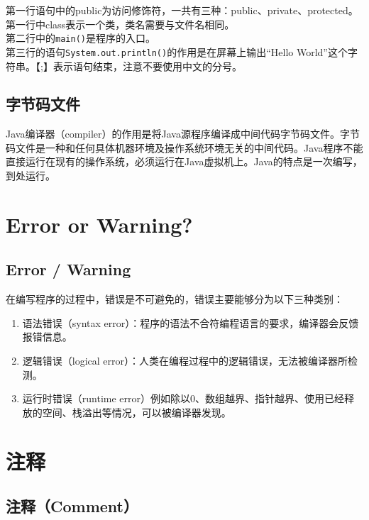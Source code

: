 第一行语句中的public为访问修饰符，一共有三种：public、private、protected。第一行中class表示一个类，类名需要与文件名相同。 \\

第二行中的\lstinline|main()|是程序的入口。 \\

第三行的语句\lstinline|System.out.println()|的作用是在屏幕上输出“Hello World”这个字符串。【;】表示语句结束，注意不要使用中文的分号。

\subsection{字节码文件}

Java编译器（compiler）的作用是将Java源程序编译成中间代码字节码文件。字节码文件是一种和任何具体机器环境及操作系统环境无关的中间代码。Java程序不能直接运行在现有的操作系统，必须运行在Java虚拟机上。Java的特点是一次编写，到处运行。

\newpage

\section{Error or Warning?}

\subsection{Error / Warning}

在编写程序的过程中，错误是不可避免的，错误主要能够分为以下三种类别：

\begin{enumerate}
	\item 语法错误（syntax error）：程序的语法不合符编程语言的要求，编译器会反馈报错信息。

	\item 逻辑错误（logical error）：人类在编程过程中的逻辑错误，无法被编译器所检测。

	\item 运行时错误（runtime error）例如除以0、数组越界、指针越界、使用已经释放的空间、栈溢出等情况，可以被编译器发现。
\end{enumerate}

\newpage

\section{注释}

\subsection{注释（Comment）}

